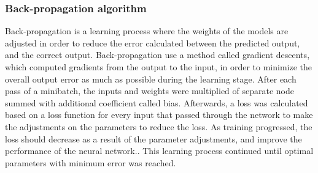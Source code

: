 \subsubsection*{\textbf{Back-propagation algorithm}}
Back-propagation is a learning process where the weights of the models are adjusted in order to reduce the error calculated between the predicted output, and the correct output. \citep{Duda2000} Back-propagation use a method called gradient descents, which computed gradients from the output to the input, in order to minimize the overall output error as much as possible during the learning stage. 
After each pass of a minibatch, the inputs and weights were multiplied of separate node summed with additional coefficient called bias.\citep{Hameed2016,LeCun1998}
Afterwards, a loss was calculated based on a loss function for every input that passed through the network to make the adjustments on the parameters to reduce the loss. As training progressed, the loss should decrease as a result of the parameter adjustments, and improve the performance of the neural network.\citep{LeCun2015, Goodfellow2016, Duda2000}. This learning process continued until optimal parameters with minimum error was reached.\citep{Hameed2016}





